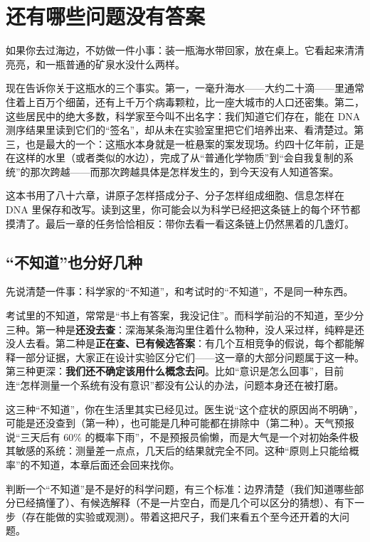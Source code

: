 \chapter{还有哪些问题没有答案}

\begin{kaichang}
如果你去过海边，不妨做一件小事：装一瓶海水带回家，放在桌上。它看起来清清亮亮，和一瓶普通的矿泉水没什么两样。

现在告诉你关于这瓶水的三个事实。第一，一毫升海水——大约二十滴——里通常住着上百万个细菌，还有上千万个病毒颗粒，比一座大城市的人口还密集。第二，这些居民中的绝大多数，科学家至今叫不出名字：我们知道它们存在，能在 DNA 测序结果里读到它们的“签名”，却从未在实验室里把它们培养出来、看清楚过。第三，也是最大的一个：这瓶水本身就是一桩悬案的案发现场。约四十亿年前，正是在这样的水里（或者类似的水边），完成了从“普通化学物质”到“会自我复制的系统”的那次跨越——而那次跨越具体是怎样发生的，到今天没有人知道答案。

这本书用了八十六章，讲原子怎样搭成分子、分子怎样组成细胞、信息怎样在 DNA 里保存和改写。读到这里，你可能会以为科学已经把这条链上的每个环节都摸清了。最后一章的任务恰恰相反：带你去看一看这条链上仍然黑着的几盏灯。
\end{kaichang}

\section{“不知道”也分好几种}

先说清楚一件事：科学家的“不知道”，和考试时的“不知道”，不是同一种东西。

考试里的不知道，常常是“书上有答案，我没记住”。而科学前沿的不知道，至少分三种。第一种是\textbf{还没去查}：深海某条海沟里住着什么物种，没人采过样，纯粹是还没人去看。第二种是\textbf{正在查、已有候选答案}：有几个互相竞争的假说，每个都能解释一部分证据，大家正在设计实验区分它们——这一章的大部分问题属于这一种。第三种更深：\textbf{我们还不确定该用什么概念去问}。比如“意识是怎么回事”，目前连“怎样测量一个系统有没有意识”都没有公认的办法，问题本身还在被打磨。

这三种“不知道”，你在生活里其实已经见过。医生说“这个症状的原因尚不明确”，可能是还没查到（第一种），也可能是几种可能都在排除中（第二种）。天气预报说“三天后有 60\% 的概率下雨”，不是预报员偷懒，而是大气是一个对初始条件极其敏感的系统：测量差一点点，几天后的结果就完全不同。这种“原则上只能给概率”的不知道，本章后面还会回来找你。

判断一个“不知道”是不是好的科学问题，有三个标准：边界清楚（我们知道哪些部分已经搞懂了）、有候选解释（不是一片空白，而是几个可以区分的猜想）、有下一步（存在能做的实验或观测）。带着这把尺子，我们来看五个至今还开着的大问题。

